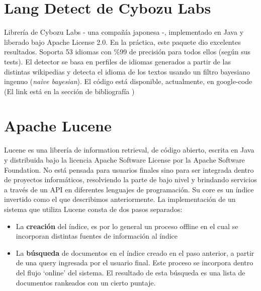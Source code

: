 \section{Lang Detect de Cybozu Labs}
\label{sec:cybozu}

Librería de Cybozu Labs - una compañía japonesa -, implementado en Java y liberado bajo Apache License 2.0. En la práctica, este paquete dio excelentes resultados. Soporta 53 idiomas con \%99 de precisión para todos ellos (según sus tests). El detector se basa en perfiles de idiomas generados a partir de las distintas wikipedias y detecta el idioma de los textos usando un filtro bayesiano ingenuo (\textit{naive bayesian}).
El código está disponible, actualmente, en google-code (El link está en la sección de bibliografía \cite{nakatani2010langdetect})


\section{Apache Lucene}
\label{sec:lucene}
Lucene es una librería de information retrieval, de c\'odigo abierto, escrita en Java y distribuida 
bajo la licencia Apache Software License por la Apache Software Foundation. No está pensada para
usuarios finales sino para ser integrada dentro de proyectos informáticos, resolviendo
la parte de bajo nivel y brindando servicios a través de un API en diferentes lenguajes de programaci\'on.
Su core es un índice invertido como el que describimos anteriormente. La implementaci\'on de un sistema
que utiliza Lucene consta de dos pasos separados:
\begin{itemize}
\item La \textbf{creaci\'on} del índice, es por lo general un proceso offline en el cual 
se incorporan distintas fuentes de informaci\'on al índice 
\item La \textbf{búsqueda} de documentos en el índice creado en el paso anterior, a partir de una query 
ingresada por el usuario final. Este proceso se incorpora dentro del flujo `online' del sistema.
El resultado de esta búsqueda es una lista de documentos rankeados con un cierto puntaje. 
\end{itemize}

